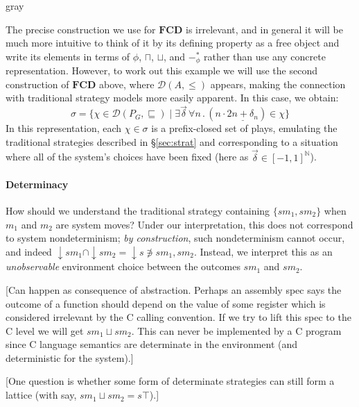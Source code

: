 \documentclass[format=sigplan,authordraft]{acmart}
\begin{document}
\begin{color}{gray}

The precise construction we use for $\mathbf{FCD}$ is irrelevant,
and in general it will be much more intuitive
to think of it by its defining property as a free object and
write its elements in terms of $\phi$, $\sqcap$, $\sqcup$, and $-_\phi^*$
rather than use any concrete representation.
However, to work out this example
we will use the second construction of $\mathbf{FCD}$ above,
where $\mathcal{D}(A, {\le})$ appears,
making the connection with traditional strategy models
more easily apparent.
In this case, we obtain:
\[
    \sigma =
    \{ \chi \in \mathcal{D}(P_G, {\sqsubseteq}) \mid
       \exists \vec{\delta} \,
       \forall n \,.\,
       (n \cdot \underline{2n + \delta_n}) \in \chi \}
\]
In this representation,
each $\chi \in \sigma$
is a prefix-closed set of plays,
emulating the traditional strategies described in \S\ref{sec:strat}
and corresponding to a situation where all of the system's choices
have been fixed (here as $\vec{\delta} \in [-1,1]^\mathbb{N}$).

\end{color}


\paragraph{Determinacy} %

How should we understand
the traditional strategy containing $\{ sm_1, sm_2 \}$
when $m_1$ and $m_2$ are system moves?
Under our interpretation,
this does not correspond to
system nondeterminism;
\emph{by construction},
such nondeterminism cannot occur,
and indeed
${\downarrow} s m_1 \cap {\downarrow} s m_2 =
 {\downarrow} s \notni
 s m_1, s m_2$.
Instead,
we interpret this as an \emph{unobservable}
environment choice
between the outcomes $s m_1$ and $s m_2$.

[Can happen as consequence of abstraction.
Perhaps an assembly spec says
the outcome of a function should depend on the value of some
register which is considered irrelevant by the C calling convention.
If we try to lift this spec to the C level
we will get $s m_1 \sqcup s m_2$.
This can never be implemented by a C program
since C language semantics are determinate in the environment
(and deterministic for the system).]

[One question is whether
some form of determinate strategies
can still form a lattice
(with say, $sm_1 \sqcup sm_2 = s \top$).]
\end{document}
